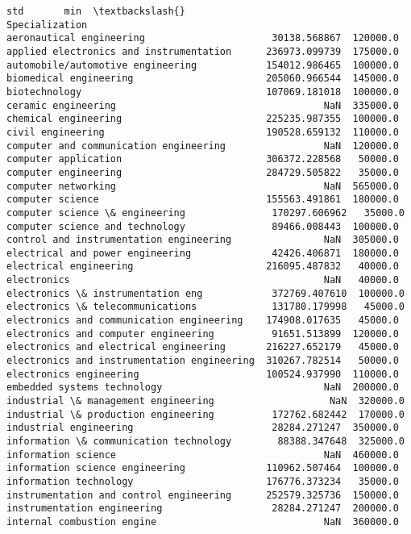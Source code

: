 \documentclass[11pt]{article}
\begin{document}
\begin{tcolorbox}[breakable, size=fbox, boxrule=.5pt, pad at break*=1mm, opacityfill=0]
\begin{Verbatim}[commandchars=\\\{\}]
                                                       std       min  \textbackslash{}
Specialization
aeronautical engineering                      30138.568867  120000.0
applied electronics and instrumentation      236973.099739  175000.0
automobile/automotive engineering            154012.986465  100000.0
biomedical engineering                       205060.966544  145000.0
biotechnology                                107069.181018  100000.0
ceramic engineering                                    NaN  335000.0
chemical engineering                         225235.987355  100000.0
civil engineering                            190528.659132  110000.0
computer and communication engineering                 NaN  120000.0
computer application                         306372.228568   50000.0
computer engineering                         284729.505822   35000.0
computer networking                                    NaN  565000.0
computer science                             155563.491861  180000.0
computer science \& engineering               170297.606962   35000.0
computer science and technology               89466.008443  100000.0
control and instrumentation engineering                NaN  305000.0
electrical and power engineering              42426.406871  180000.0
electrical engineering                       216095.487832   40000.0
electronics                                            NaN   40000.0
electronics \& instrumentation eng            372769.407610  100000.0
electronics \& telecommunications             131780.179998   45000.0
electronics and communication engineering    174908.017635   45000.0
electronics and computer engineering          91651.513899  120000.0
electronics and electrical engineering       216227.652179   45000.0
electronics and instrumentation engineering  310267.782514   50000.0
electronics engineering                      100524.937990  110000.0
embedded systems technology                            NaN  200000.0
industrial \& management engineering                    NaN  320000.0
industrial \& production engineering          172762.682442  170000.0
industrial engineering                        28284.271247  350000.0
information \& communication technology        88388.347648  325000.0
information science                                    NaN  460000.0
information science engineering              110962.507464  100000.0
information technology                       176776.373234   35000.0
instrumentation and control engineering      252579.325736  150000.0
instrumentation engineering                   28284.271247  200000.0
internal combustion engine                             NaN  360000.0

\end{Verbatim}
\end{tcolorbox}
\end{document}
